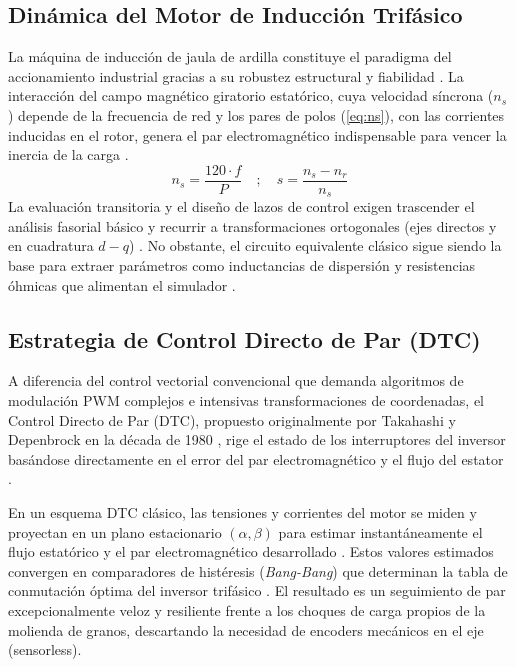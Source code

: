 \documentclass[conference]{IEEEtran}
\begin{document}
\subsection{Dinámica del Motor de Inducción Trifásico}
La máquina de inducción de jaula de ardilla constituye el paradigma del accionamiento industrial gracias a su robustez estructural y fiabilidad \cite{chapman2012}. La interacción del campo magnético giratorio estatórico, cuya velocidad síncrona ($n_s$) depende de la frecuencia de red y los pares de polos (\autoref{eq:ns}), con las corrientes inducidas en el rotor, genera el par electromagnético indispensable para vencer la inercia de la carga \cite{fitzgerald2003, krishnan2001}.
\begin{equation}
    n_s = \frac{120 \cdot f}{P} \quad ; \quad s = \frac{n_s - n_r}{n_s}
    \label{eq:ns}
\end{equation}
La evaluación transitoria y el diseño de lazos de control exigen trascender el análisis fasorial básico y recurrir a transformaciones ortogonales (ejes directos y en cuadratura $d-q$) \cite{leonhard2001}. No obstante, el circuito equivalente clásico sigue siendo la base para extraer parámetros como inductancias de dispersión y resistencias óhmicas que alimentan el simulador \cite{ieee112}.

\subsection{Estrategia de Control Directo de Par (DTC)}
A diferencia del control vectorial convencional que demanda algoritmos de modulación PWM complejos e intensivas transformaciones de coordenadas, el Control Directo de Par (DTC), propuesto originalmente por Takahashi y Depenbrock en la década de 1980 \cite{takahashi1986, depenbrock1988}, rige el estado de los interruptores del inversor basándose directamente en el error del par electromagnético y el flujo del estator \cite{vas1998}.

En un esquema DTC clásico, las tensiones y corrientes del motor se miden y proyectan en un plano estacionario $(\alpha, \beta)$ para estimar instantáneamente el flujo estatórico y el par electromagnético desarrollado \cite{kazmierkowski2002}. Estos valores estimados convergen en comparadores de histéresis (\textit{Bang-Bang}) que determinan la tabla de conmutación óptima del inversor trifásico \cite{bose2001}. El resultado es un seguimiento de par excepcionalmente veloz y resiliente frente a los choques de carga propios de la molienda de granos, descartando la necesidad de encoders mecánicos en el eje (sensorless).
\end{document}
